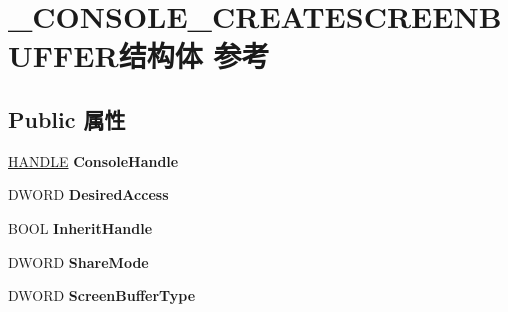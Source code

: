 \hypertarget{struct___c_o_n_s_o_l_e___c_r_e_a_t_e_s_c_r_e_e_n_b_u_f_f_e_r}{}\section{\+\_\+\+C\+O\+N\+S\+O\+L\+E\+\_\+\+C\+R\+E\+A\+T\+E\+S\+C\+R\+E\+E\+N\+B\+U\+F\+F\+E\+R结构体 参考}
\label{struct___c_o_n_s_o_l_e___c_r_e_a_t_e_s_c_r_e_e_n_b_u_f_f_e_r}
\subsection*{Public 属性}
\begin{DoxyCompactItemize}
\item 
\mbox{\label{struct___c_o_n_s_o_l_e___c_r_e_a_t_e_s_c_r_e_e_n_b_u_f_f_e_r_a254ebca9f908732e93f78e0b3bec001e}} 
\hyperlink{interfacevoid}{H\+A\+N\+D\+LE} {\bfseries Console\+Handle}
\item 
\mbox{\label{struct___c_o_n_s_o_l_e___c_r_e_a_t_e_s_c_r_e_e_n_b_u_f_f_e_r_a493dd7d6d65da6ca0d4be9e715e5e3ba}} 
D\+W\+O\+RD {\bfseries Desired\+Access}
\item 
\mbox{\label{struct___c_o_n_s_o_l_e___c_r_e_a_t_e_s_c_r_e_e_n_b_u_f_f_e_r_a06729d8646ed00ee8ceafffa888a6967}} 
B\+O\+OL {\bfseries Inherit\+Handle}
\item 
\mbox{\label{struct___c_o_n_s_o_l_e___c_r_e_a_t_e_s_c_r_e_e_n_b_u_f_f_e_r_abc073095da16da3b6a8ac5073bb4208b}} 
D\+W\+O\+RD {\bfseries Share\+Mode}
\item 
\mbox{\label{struct___c_o_n_s_o_l_e___c_r_e_a_t_e_s_c_r_e_e_n_b_u_f_f_e_r_a12599181190c2719bfb0ea7c5ff10926}} 
D\+W\+O\+RD {\bfseries Screen\+Buffer\+Type}
\item 
\mbox{\label{struct___c_o_n_s_o_l_e___c_r_e_a_t_e_s_c_r_e_e_n_b_u_f_f_e_r_af3821b6fce9bdbd0409b2e3b479c0ad3}} 

\end{DoxyCompactItemize}
